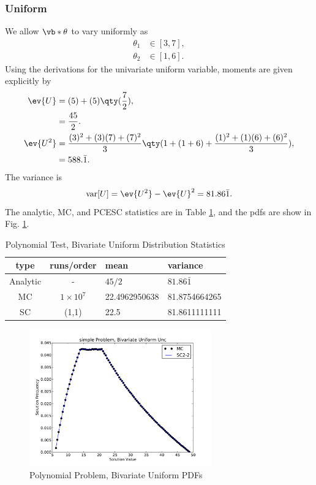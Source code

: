 \subsubsection{Uniform}
We allow $\vb*{\theta}$ to vary uniformly as
\begin{align}
\theta_1 &\in[3,7],\\
\theta_2 &\in[1,6].
\end{align}
Using the derivations for the univariate uniform variable, moments are given explicitly by
\begin{align}
\ev{U}&=(5)+(5)\qty(\frac{7}{2}), \\
  &= \frac{45}{2}.\\
\ev{U^2} &= \frac{(3)^2+(3)(7)+(7)^2}{3}\qty(1+(1+6)+\frac{(1)^2+(1)(6)+(6)^2}{3}),\\
  &= 588.\bar1.
\end{align}
The variance is
\begin{equation}
\text{var}[U]=\ev{U^2}-\ev{U}^2=81.86\bar1.
\end{equation}
The analytic, MC, and PCESC statistics are in Table \ref{tab:2v poly uniform}, and the pdfs are show in Fig. \ref{fig:2v poly uni}.

\begin{table}[H]
\begin{center}
\begin{tabular}{c c|l l}
type & runs/order & mean & variance \\ \hline
Analytic & - & $45/2$ & $81.86\bar1$ \\
MC & $1\times10^7$ & 22.4962950638 & 81.8754664265 \\
SC & (1,1) & 22.5 & 81.8611111111 \\
\end{tabular}
\end{center}
\caption{Polynomial Test, Bivariate Uniform Distribution Statistics}
\label{tab:2v poly uniform}
\end{table}

\begin{figure}[H]
\centering
   \includegraphics[width=0.7\textwidth]{../graphics/poly_2v_uniform_pdfs}
   \caption{Polynomial Problem, Bivariate Uniform PDFs}
      \label{fig:2v poly uni}
\end{figure}